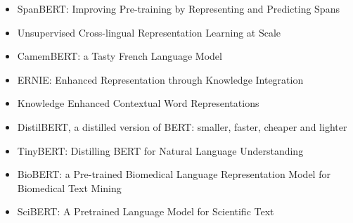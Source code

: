 \begin{itemize}
    \item {SpanBERT: Improving Pre-training by Representing and Predicting Spans} \cite{joshi2020spanbert}
    \item {Unsupervised Cross-lingual Representation Learning at Scale} \cite{conneau2019unsupervised}
    \item {CamemBERT: a Tasty French Language Model} \cite{martin2019camembert}
    \item {ERNIE: Enhanced Representation through Knowledge Integration} \cite{sun2019ernie}
    \item {Knowledge Enhanced Contextual Word Representations} \cite{peters2019knowledge}
    \item {DistilBERT, a distilled version of BERT: smaller, faster, cheaper and lighter} \cite{sanh2019distilbert}
    \item {TinyBERT: Distilling BERT for Natural Language Understanding} \cite{jiao2019tinybert}
    \item {BioBERT: a Pre-trained Biomedical Language Representation Model for Biomedical Text Mining} \cite{lee2020biobert}
    \item {SciBERT: A Pretrained Language Model for Scientific Text} \cite{beltagy2019scibert}
\end{itemize}